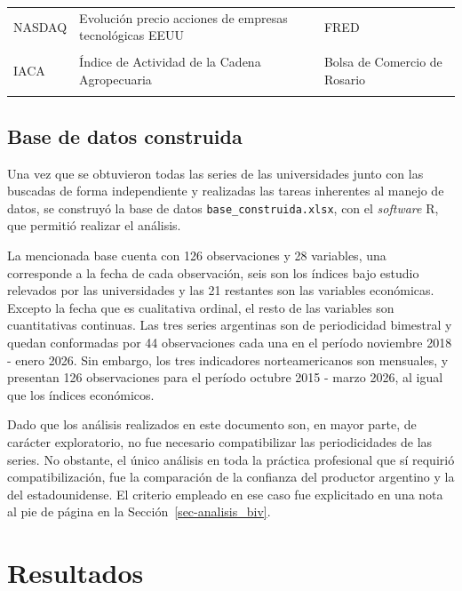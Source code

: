 \documentclass[12pt]{article}
\begin{document}
\begin{ThreePartTable}
\begin{longtable}[t]{>{\raggedright\arraybackslash}p{3.5cm}>{\raggedright\arraybackslash}p{7.5cm}>{\raggedright\arraybackslash}p{5cm}}
NASDAQ & Evolución precio acciones de empresas tecnológicas EEUU & FRED\\
\addlinespace
\cellcolor{gray!10}{Dow Jones} & \cellcolor{gray!10}{Rendimiento de las 30 mayores empresas de EEUU} & \cellcolor{gray!10}{Yahoo Finance}\\
IACA & Índice de Actividad de la Cadena Agropecuaria & Bolsa de Comercio de Rosario\\*

\end{longtable}

\end{ThreePartTable}

\subsection{Base de datos construida}\label{base-de-datos-construida}

Una vez que se obtuvieron todas las series de las universidades junto
con las buscadas de forma independiente y realizadas las tareas
inherentes al manejo de datos, se construyó la base de datos
\texttt{base\_construida.xlsx}, con el \emph{software} R, que permitió
realizar el análisis.

La mencionada base cuenta con 126 observaciones y 28 variables, una
corresponde a la fecha de cada observación, seis son los índices bajo
estudio relevados por las universidades y las 21 restantes son las
variables económicas. Excepto la fecha que es cualitativa ordinal, el
resto de las variables son cuantitativas continuas. Las tres series
argentinas son de periodicidad bimestral y quedan conformadas por 44
observaciones cada una en el período noviembre 2018 - enero 2026. Sin
embargo, los tres indicadores norteamericanos son mensuales, y presentan
126 observaciones para el período octubre 2015 - marzo 2026, al igual
que los índices económicos.

Dado que los análisis realizados en este documento son, en mayor parte,
de carácter exploratorio, no fue necesario compatibilizar las
periodicidades de las series. No obstante, el único análisis en toda la
práctica profesional que sí requirió compatibilización, fue la
comparación de la confianza del productor argentino y la del
estadounidense. El criterio empleado en ese caso fue explicitado en una
nota al pie de página en la Sección~\ref{sec-analisis_biv}.

\newpage

\section{Resultados}\label{resultados}
\end{document}
